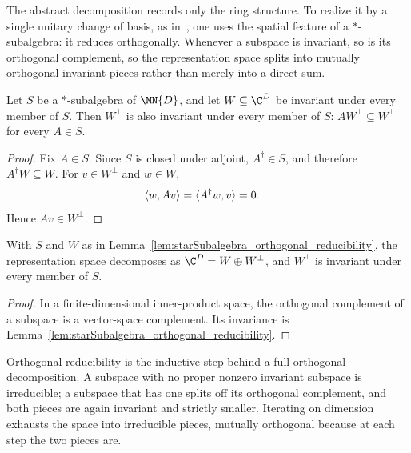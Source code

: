 The abstract decomposition records only the ring structure. To realize it by
a single unitary change of basis, as
in~\cite[Theorem~6.14]{Wolf2012Quantum}, one uses the spatial feature of a
$*$-subalgebra: it reduces orthogonally. Whenever a subspace is invariant,
so is its orthogonal complement, so the representation space splits into
mutually orthogonal invariant pieces rather than merely into a direct sum.

\begin{lemma}%
    \label{lem:starSubalgebra_orthogonal_reducibility}
    \leanok
    Let $S$ be a $*$-subalgebra of $\MN{D}$, and let
    $W\subseteq\C^D$ be invariant under every member of $S$. Then
    $W^\perp$ is also invariant under every member of $S$:
    $AW^\perp\subseteq W^\perp$ for every $A\in S$.
\end{lemma}

\begin{proof}
    \leanok
    Fix $A\in S$. Since $S$ is closed under adjoint, $A^\dagger\in S$, and
    therefore $A^\dagger W\subseteq W$. For $v\in W^\perp$ and $w\in W$,
    \begin{align}
        \langle w,Av\rangle
        &=\langle A^\dagger w,v\rangle=0.
        \notag
    \end{align}
    Hence $Av\in W^\perp$.
\end{proof}

\begin{lemma}%
    \label{lem:starSubalgebra_isCompl_orthogonal}
    \leanok
    With $S$ and $W$ as in
    Lemma~\ref{lem:starSubalgebra_orthogonal_reducibility}, the
    representation space decomposes as
    $\C^D=W\oplus W^\perp$, and $W^\perp$ is invariant under every member
    of $S$.
\end{lemma}

\begin{proof}
    \leanok
    In a finite-dimensional inner-product space, the orthogonal complement
    of a subspace is a vector-space complement. Its invariance is
    Lemma~\ref{lem:starSubalgebra_orthogonal_reducibility}.
\end{proof}

Orthogonal reducibility is the inductive step behind a full orthogonal
decomposition. A subspace with no proper nonzero invariant subspace is
irreducible; a subspace that has one splits off its orthogonal complement,
and both pieces are again invariant and strictly smaller. Iterating on
dimension exhausts the space into irreducible pieces, mutually orthogonal
because at each step the two pieces are.

